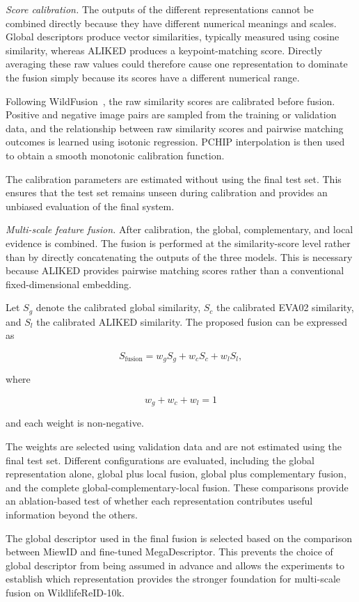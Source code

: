 \documentclass[runningheads]{llncs}
\begin{document}
\emph{Score calibration.}
The outputs of the different representations cannot be combined directly because they have different
numerical meanings and scales. Global descriptors produce vector similarities, typically measured
using cosine similarity, whereas ALIKED produces a keypoint-matching score. Directly averaging these
raw values could therefore cause one representation to dominate the fusion simply because its scores
have a different numerical range.

Following WildFusion~\cite{cermak2024wildfusion}, the raw similarity scores are calibrated before
fusion. Positive and negative image pairs are sampled from the training or validation data, and the
relationship between raw similarity scores and pairwise matching outcomes is learned using isotonic
regression. PCHIP interpolation is then used to obtain a smooth monotonic calibration function.

The calibration parameters are estimated without using the final test set. This ensures that the
test set remains unseen during calibration and provides an unbiased evaluation of the final system.

\emph{Multi-scale feature fusion.}
After calibration, the global, complementary, and local evidence is combined. The fusion is performed
at the similarity-score level rather than by directly concatenating the outputs of the three
models. This is necessary because ALIKED provides pairwise matching scores rather than a conventional
fixed-dimensional embedding.

Let $S_g$ denote the calibrated global similarity, $S_c$ the calibrated EVA02 similarity, and
$S_l$ the calibrated ALIKED similarity. The proposed fusion can be expressed as

\[
S_{\mathrm{fusion}}
=
w_g S_g
+
w_c S_c
+
w_l S_l,
\]

where

\[
w_g+w_c+w_l=1
\]

and each weight is non-negative.

The weights are selected using validation data and are not estimated using the final test set.
Different configurations are evaluated, including the global representation alone, global plus
local fusion, global plus complementary fusion, and the complete global-complementary-local fusion.
These comparisons provide an ablation-based test of whether each representation contributes useful
information beyond the others.

The global descriptor used in the final fusion is selected based on the comparison between MiewID and
fine-tuned MegaDescriptor. This prevents the choice of global descriptor from being assumed in advance
and allows the experiments to establish which representation provides the stronger foundation for
multi-scale fusion on WildlifeReID-10k.
\end{document}
